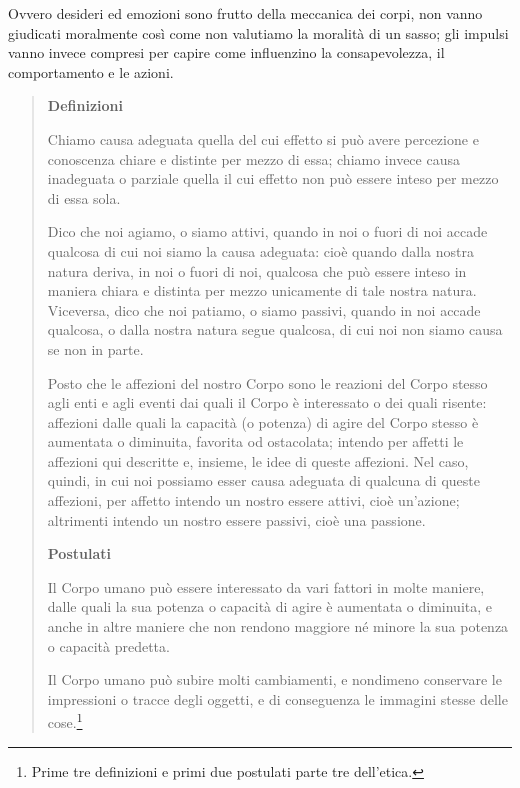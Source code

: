 Ovvero desideri ed emozioni sono frutto della meccanica dei corpi, non vanno giudicati moralmente così come non valutiamo la moralità di un sasso; gli impulsi vanno invece compresi per capire come influenzino la consapevolezza, il comportamento e le azioni.

\begin{quotation}
	\begin{center}
	\textbf{Definizioni}	
	\end{center}

\small Chiamo causa adeguata quella del cui effetto si può avere percezione e conoscenza
	chiare e distinte per mezzo di essa; chiamo invece causa inadeguata o parziale quella il cui
	effetto non può essere inteso per mezzo di essa sola.
	
	Dico che noi agiamo, o siamo attivi, quando in noi o fuori di noi accade qualcosa di
	cui noi siamo la causa adeguata: cioè quando dalla nostra natura deriva, in noi o fuori di noi, qualcosa che può essere inteso in maniera chiara e distinta per
	mezzo unicamente di tale nostra natura. Viceversa, dico che noi patiamo, o siamo passivi,
	quando in noi accade qualcosa, o dalla nostra natura segue qualcosa, di cui noi non siamo
	causa se non in parte.
	
	 Posto che le affezioni del nostro Corpo sono le reazioni del Corpo stesso agli enti e agli
	eventi dai quali il Corpo è interessato o dei quali risente: affezioni dalle quali la capacità (o potenza) di
	agire del Corpo stesso è aumentata o diminuita, favorita od ostacolata; intendo per affetti le affezioni qui descritte e, insieme, le idee di queste affezioni.
	Nel caso, quindi, in cui noi possiamo esser causa adeguata di qualcuna di queste affezioni, per affetto intendo un nostro essere attivi, cioè un’azione; altrimenti intendo un
	nostro essere passivi, cioè una passione.
	
	\begin{center}
	\normalsize \textbf{Postulati}	
	\end{center}

	\small Il Corpo umano può essere interessato da vari fattori in molte maniere, dalle quali la
	sua potenza o capacità di agire è aumentata o diminuita, e anche in altre maniere che non
	rendono maggiore né minore la sua potenza o capacità predetta.
	
	Il Corpo umano può subire molti cambiamenti, e nondimeno conservare le impressioni o tracce degli oggetti, e di conseguenza le immagini stesse delle cose.\footnote{Prime tre definizioni e primi due postulati parte tre dell'etica.}
\end{quotation}

